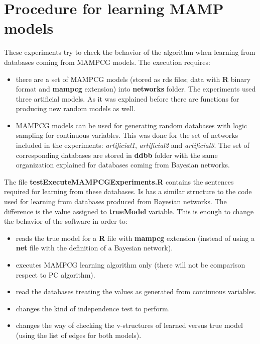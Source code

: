 \documentclass[11pt,professionalfont]{article}
\begin{document}
\section{Procedure for learning MAMP models}

These experiments try to check the behavior of the algorithm when learning from 
databases coming from MAMPCG models. The execution requires:

\begin{itemize}
\item there are a set of MAMPCG models (stored as rds files; data with 
\textbf{R} binary format and \textbf{mampcg} extension) into \textbf{networks}
folder. The experiments used three artificial models. As it was explained before 
there are functions for producing new random models as well.

\item MAMPCG models can be used for generating random databases with logic
sampling for continuous variables. This was done for the set of networks 
included in the experiments: \textit{artificial1}, \textit{artificial2} 
and \textit{artificial3}. The set of corresponding databases are stored in 
\textbf{ddbb} folder with the same organization explained for databases 
coming from Bayesian networks. 
\end{itemize}

The file \textbf{testExecuteMAMPCGExperiments.R} contains the sentences
required for learning from these databases. Is has a similar structure
to the code used for learning from databases produced from Bayesian networks.
The difference is the value assigned to \textbf{trueModel} variable. This
is enough to change the behavior of the software in order to:

\begin{itemize}
\item reads the true model for a \textbf{R} file with \textbf{mampcg}
extension (instead of using a \textbf{net} file with the definition of
a Bayesian network).

\item executes MAMPCG learning algorithm only (there will not be comparison
respect to PC algorithm).

\item read the databases treating the values as generated from continuous
variables.

\item changes the kind of independence test to perform.

\item changes the way of checking the v-structures of learned versus true
model (using the list of edges for both models).
\end{itemize}
\end{document}
